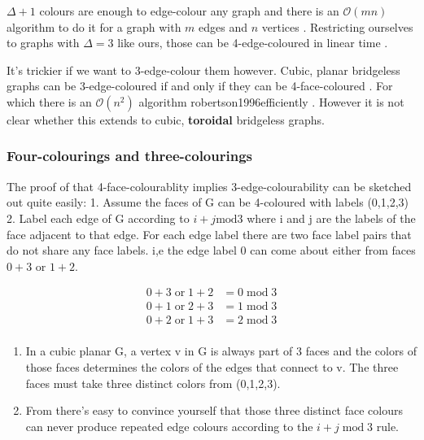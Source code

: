 \(\Delta + 1\) colours are enough to edge-colour any graph and there is
an \(\mathcal{O}(mn)\) algorithm to do it for a graph with \(m\) edges
and \(n\) vertices \textcite{gEstimateChromaticClass1964}. Restricting
ourselves to graphs with \(\Delta = 3\) like ours, those can be
4-edge-coloured in linear time
\textcite{skulrattanakulchai4edgecoloringGraphsMaximum2002} .

It's trickier if we want to 3-edge-colour them however. Cubic, planar
bridgeless graphs can be 3-edge-coloured if and only if they can be
4-face-coloured \textcite{tait1880remarks} . For which there is an
\(\mathcal{O}(n^2)\) algorithm robertson1996efficiently . However it is
not clear whether this extends to cubic, \textbf{toroidal} bridgeless
graphs.

\hypertarget{four-colourings-and-three-colourings}{%
\subsubsection{Four-colourings and
three-colourings}\label{four-colourings-and-three-colourings}}

The proof of that 4-face-colourablity implies 3-edge-colourability can
be sketched out quite easily: 1. Assume the faces of G can be 4-coloured
with labels (0,1,2,3) 2. Label each edge of G according to
\(i + j \mathrm{mod} 3\) where i and j are the labels of the face
adjacent to that edge. For each edge label there are two face label
pairs that do not share any face labels. i,e the edge label \(0\) can
come about either from faces \(0 + 3\) or \(1 + 2\).

\[\begin{aligned}
0 + 3 \;\mathrm{or}\; 1 + 2 &= 0 \;\mathrm{mod}\; 3\\ 
0 + 1 \;\mathrm{or}\; 2 + 3 &= 1 \;\mathrm{mod}\; 3\\
0 + 2 \;\mathrm{or}\;1 + 3 &= 2 \;\mathrm{mod}\; 3\\
\end{aligned}
\]

\begin{enumerate}
\def\labelenumi{\arabic{enumi}.}
\setcounter{enumi}{2}
\tightlist
\item
  In a cubic planar G, a vertex v in G is always part of 3 faces and the
  colors of those faces determines the colors of the edges that connect
  to v. The three faces must take three distinct colors from (0,1,2,3).
\item
  From there's easy to convince yourself that those three distinct face
  colours can never produce repeated edge colours according to the
  \(i+j \;\mathrm{mod}\; 3\) rule.
\end{enumerate}

